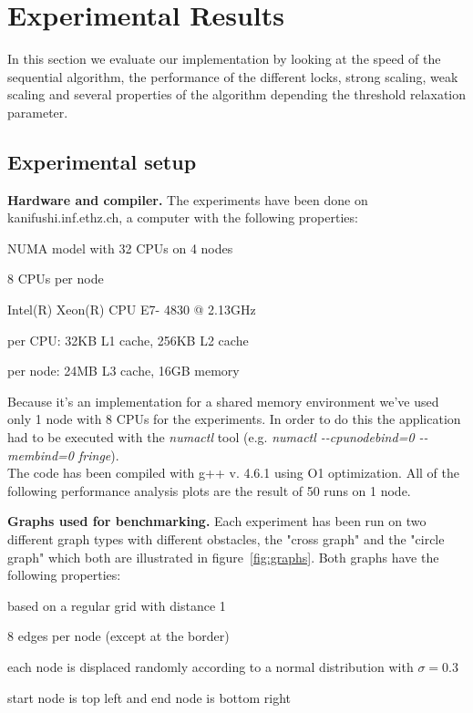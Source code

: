 \documentclass[letterpaper]{article}
\newcommand{\mypar}[1]{{\bf #1.}}
\begin{document}
\section{Experimental Results}\label{sec:exp}

In this section we evaluate our implementation by looking at the speed of the sequential algorithm, the performance of the different locks, strong scaling, weak scaling and several properties of the algorithm depending the threshold relaxation parameter.

\subsection{Experimental setup}\label{ssec:setup}

\mypar{Hardware and compiler}
The experiments have been done on kanifushi.inf.ethz.ch, a computer with the following properties:
\begin{compactitem}
\item NUMA model with 32 CPUs on 4 nodes
\item 8 CPUs per node
\item Intel(R) Xeon(R) CPU E7- 4830 @ 2.13GHz
\item per CPU: 32KB L1 cache, 256KB L2 cache
\item per node: 24MB L3 cache, 16GB memory
\end{compactitem}
Because it's an implementation for a shared memory environment we've used only 1 node with 8 CPUs for the experiments. In order to do this the application had to be executed with the \textit{numactl} tool (e.g. \textit{numactl -{}-cpunodebind=0 -{}-membind=0 fringe}).\\
The code has been compiled with g++ v. 4.6.1 using O1 optimization. All of the following performance analysis plots are the result of 50 runs on 1 node.

\mypar{Graphs used for benchmarking}
Each experiment has been run on two different graph types with different obstacles, the "cross graph" and the "circle graph" which both are illustrated in figure~\ref{fig:graphs}. Both graphs have the following properties:
\begin{compactitem}
\item based on a regular grid with distance 1
\item 8 edges per node (except at the border)
\item each node is displaced randomly according to a normal distribution with $\sigma = 0.3$
\item start node is top left and end node is bottom right
\end{compactitem}
\end{document}
